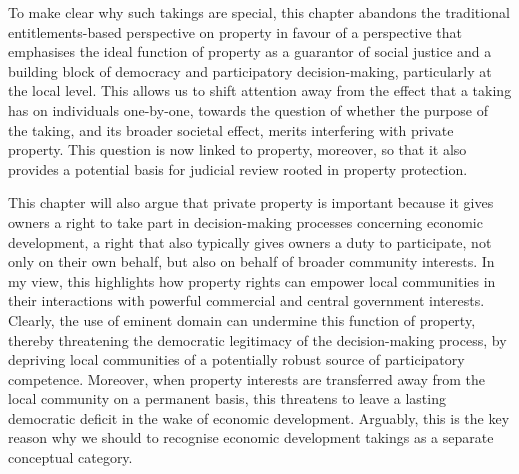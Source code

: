 To make clear why such takings are special, this chapter abandons the traditional entitlements-based perspective on property in favour of a perspective that emphasises the ideal function of property as a guarantor of social justice and a building block of democracy and participatory decision-making, particularly at the local level. This allows us to shift attention away from the effect that a taking has on individuals one-by-one, towards the question of whether the purpose of the taking, and its broader societal effect, merits interfering with private property. This question is now linked to property, moreover, so that it also provides a potential basis for judicial review rooted in property protection.

This chapter will also argue that private property is important because it gives owners a right to take part in decision-making processes concerning economic development, a right that also typically gives owners a duty to participate, not only on their own behalf, but also on behalf of broader community interests. In my view, this highlights how property rights can empower local communities in their interactions with powerful commercial and central government interests. Clearly, the use of eminent domain can undermine this function of property, thereby threatening the democratic legitimacy of the decision-making process, by depriving local communities of a potentially robust source of participatory competence. Moreover, when property interests are transferred away from the local community on a permanent basis, this threatens to leave a lasting democratic deficit in the wake of economic development. Arguably, this is the key reason why we should to recognise economic development takings as a separate conceptual category.

